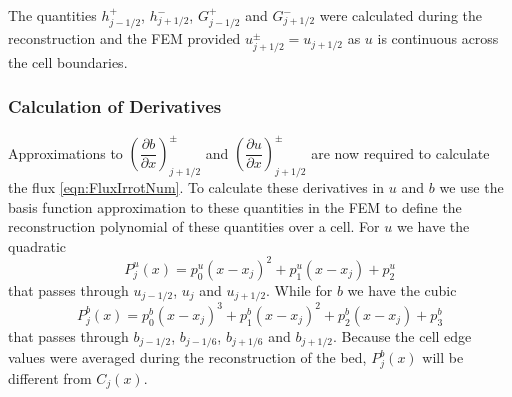The quantities $h^+_{j - 1/2}$, $h^-_{j + 1/2}$, $G^+_{j - 1/2}$ and $G^-_{j + 1/2}$ were calculated during the reconstruction and the FEM provided $u^\pm_{j+1/2} = u_{j+1/2}$ as $u$ is continuous across the cell boundaries.

\subsubsection{Calculation of Derivatives}
Approximations to $\left(\dfrac{\partial {b}}{\partial x} \right)^\pm_{j + 1/2}$ and $\left(\dfrac{\partial {u}}{\partial x} \right)^\pm_{j + 1/2}$ are now required to calculate the flux \eqref{eqn:FluxIrrotNum}. To calculate these derivatives in $u$ and $b$ we use the basis function approximation to these quantities in the FEM to define the reconstruction polynomial of these quantities over a cell. For $u$ we have the quadratic
	\begin{equation}
	P^u_j(x) = p^u_0 \left(x - x_j\right)^2 + p^u_1 \left(x - x_j\right) + p^u_2
	\label{eqn:Polyforucell}
	\end{equation}
that passes through $u_{j-1/2}$, $u_j$ and $u_{j+1/2}$. While for $b$ we have the cubic
	\begin{equation}
	P^b_j(x) = p^b_0 \left(x - x_j\right)^3 + p^b_1 \left(x - x_j\right)^2 + p^b_2 \left(x - x_j\right)  + p^b_3
	\label{eqn:Polyforbcell}
	\end{equation}
that passes through $b_{j-1/2}$, $b_{j-1/6}$, $b_{j+1/6}$ and $b_{j+1/2}$. Because the cell edge values were averaged during the reconstruction of the bed, $P^b_j(x)$ will be different from $C_j(x)$.

